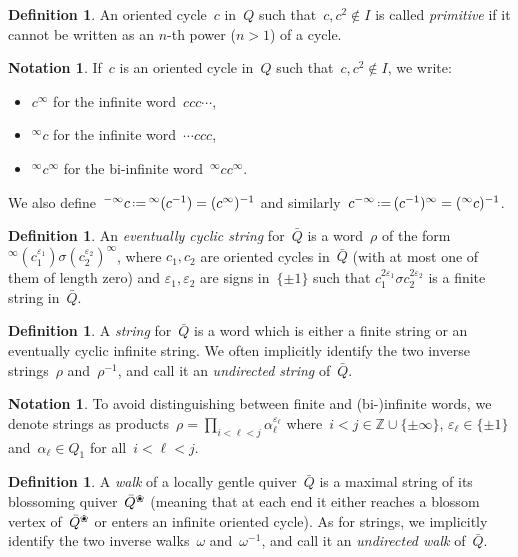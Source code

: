 \documentclass{amsart}
\theoremstyle{definition}
\newtheorem{definition}[theorem]{Definition}
\newtheorem{notation}[theorem]{Notation}
\newcommand{\Z}{\mathbb{Z}} %
\newcommand{\eqdef}{\mbox{\,\raisebox{0.2ex}{\scriptsize\ensuremath{\mathrm:}}\ensuremath{=}\,}} %
\newcommand{\darkblue}{\color{darkblue}} %
\newcommand{\defn}[1]{\textsl{\darkblue #1}} %
\newcommand{\blossom}{^\text{\ding{96}}} %
\begin{document}
\begin{definition}
An oriented cycle~$c$ in~$Q$ such that~$c, c^2 \notin I$ is called \defn{primitive} if it cannot be written as an $n$-th power ($n>1$) of a cycle.
\end{definition}

\begin{notation}
If~$c$ is an oriented cycle in~$Q$ such that~$c, c^2 \notin I$, we write:
\begin{itemize}
\item $c^\infty$ for the infinite word~$c c c\cdots$,
\item ${}^\infty c$ for the infinite word~$\cdots c c c$,
\item $^\infty c^\infty$ for the bi-infinite word~$^\infty c c^\infty$.
\end{itemize}
We also define~${}^{-\infty}c \eqdef {}^{\infty}(c^{-1}) = (c^\infty)^{-1}$ and similarly~$c^{-\infty} \eqdef (c^{-1})^\infty = (^\infty c)^{-1}$.
\end{notation}

\begin{definition}
An \defn{eventually cyclic string} for~$\bar Q$ is a word~$\rho$ of the form~${}^\infty(c_1^{\varepsilon_1})\sigma (c_2^{\varepsilon_2})^\infty$, where $c_1, c_2$ are oriented cycles in~$\bar Q$ (with at most one of them of length zero) and $\varepsilon_1, \varepsilon_2$ are signs in~$\{\pm 1\}$ such that $c_1^{2\varepsilon_1} \sigma c_2^{2\varepsilon_2}$ is a finite string in~$\bar Q$.
\end{definition}

\begin{definition}
A \defn{string} for~$\bar Q$ is a word which is either a finite string or an eventually cyclic infinite string.
We often implicitly identify the two inverse strings~$\rho$ and~$\rho^{-1}$, and call it an \defn{undirected string} of~$\bar Q$.
\end{definition}

\begin{notation}
To avoid distinguishing between finite and (bi-)infinite words, we denote strings as products~$\rho = \prod_{i < \ell < j} \alpha_\ell^{\varepsilon_\ell}$ where~$i < j \in \Z \cup \{\pm \infty\}$, $\varepsilon_\ell\in\{\pm 1\}$ and~$\alpha_\ell \in Q_1$ for all~$i < \ell < j$.
\end{notation}

\begin{definition}
\label{def:walk}
A \defn{walk} of a locally gentle quiver~$\bar Q$ is a maximal string of its blossoming quiver~$\bar Q \blossom$ (meaning that at each end it either reaches a blossom vertex of~$\bar Q \blossom$ or enters an infinite oriented cycle).
As for strings, we implicitly identify the two inverse walks~$\omega$ and~$\omega^{-1}$, and call it an \defn{undirected walk} of~$\bar Q$.
\end{definition}
\end{document}

